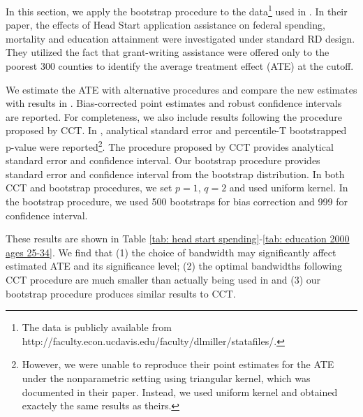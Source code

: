 \documentclass[12pt,fleqn]{article}
\begin{document}
In this section, we apply the bootstrap procedure to the data\footnote{The data is publicly available from http://faculty.econ.ucdavis.edu/faculty/dlmiller/statafiles/.} used in \cite{ludwig2007}. In their paper, the effects of Head Start application assistance on federal spending, mortality and education attainment were investigated under standard RD design. They utilized the fact that grant-writing assistance were offered only to the poorest 300 counties to identify the average treatment effect (ATE) at the cutoff.

We estimate the ATE with alternative procedures and compare the new estimates with results in \cite{ludwig2007}. Bias-corrected point estimates and robust confidence intervals are reported. For completeness, we also include results following the procedure proposed by CCT. In \cite{ludwig2007}, analytical standard error and percentile-T bootstrapped p-value were reported\footnote{However, we were unable to reproduce their point estimates for the ATE under the nonparametric setting using triangular kernel, which was documented in their paper. Instead, we used uniform kernel and obtained exactely the same results as theirs.}. The procedure proposed by CCT provides analytical standard error and confidence interval. Our bootstrap procedure provides standard error and confidence interval from the bootstrap distribution. In both CCT and bootstrap procedures, we set $p = 1$, $q = 2$ and used uniform kernel. In the bootstrap procedure, we used 500 bootstraps for bias correction and 999 for confidence interval.

These results are shown in Table \ref{tab: head start spending}-\ref{tab: education 2000 ages 25-34}. We find that (1) the choice of bandwidth may significantly affect estimated ATE and its significance level; (2) the optimal bandwidths following CCT procedure are much smaller than actually being used in \cite{ludwig2007} and (3) our bootstrap procedure produces similar results to CCT.
\end{document}
